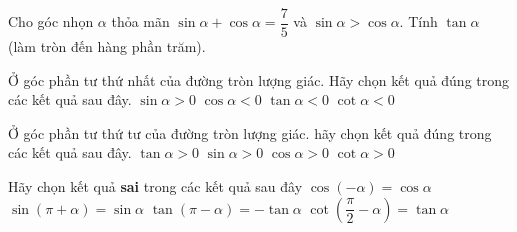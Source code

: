\begin{bt}%
	Cho góc nhọn $\alpha$ thỏa mãn $\sin\alpha+\cos\alpha=\dfrac75$ và $\sin\alpha>\cos\alpha$. Tính $\tan\alpha$ (làm tròn đến hàng phần trăm).
\end{bt}

\begin{ex}%
	Ở góc phần tư thứ nhất của  đường tròn lượng giác. Hãy chọn kết quả đúng trong các kết quả sau đây.
	\choice 
		{\True $\sin \alpha  >0$}
		{$\cos \alpha <0$} 
		 {$\tan \alpha <0$}
		{$\cot \alpha <0$} 
\end{ex}

\begin{ex}%
	Ở góc phần tư  thứ tư của đường tròn lượng giác. hãy chọn kết quả đúng trong các kết quả sau đây.
	\choice 
		{$\tan  \alpha >0$}
		{$\sin \alpha >0$} 
		 {\True $\cos \alpha >0$}
		{$\cot \alpha >0$} 
\end{ex}

\begin{ex}%
	Hãy chọn kết quả \textbf{sai} trong các kết quả sau đây 
	\choice 
		 {$\cos (-\alpha)=\cos \alpha $}
		{\True $\sin  (\pi +\alpha)=\sin \alpha $}
		{$\tan (\pi -\alpha)=-\tan \alpha  $}
		{$\cot \left(\dfrac{\pi}{2}  -\alpha \right)=\tan \alpha $}
\end{ex}

